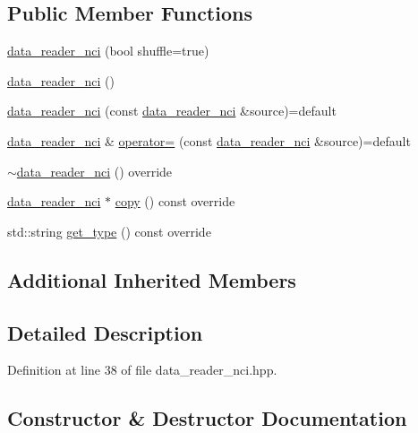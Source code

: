 \subsection*{Public Member Functions}
\begin{DoxyCompactItemize}
\item 
\hyperlink{classlbann_1_1data__reader__nci_aec1e091b879a3a2dee1329dd3e245bd3}{data\+\_\+reader\+\_\+nci} (bool shuffle=true)
\item 
\hyperlink{classlbann_1_1data__reader__nci_a42a40564a0110df69b99832e520111e6}{data\+\_\+reader\+\_\+nci} ()
\item 
\hyperlink{classlbann_1_1data__reader__nci_a3d2f93ffb61faabbdc7006030c518311}{data\+\_\+reader\+\_\+nci} (const \hyperlink{classlbann_1_1data__reader__nci}{data\+\_\+reader\+\_\+nci} \&source)=default
\item 
\hyperlink{classlbann_1_1data__reader__nci}{data\+\_\+reader\+\_\+nci} \& \hyperlink{classlbann_1_1data__reader__nci_aad2847ee20ec7f8d7d25c2ebfff1361e}{operator=} (const \hyperlink{classlbann_1_1data__reader__nci}{data\+\_\+reader\+\_\+nci} \&source)=default
\item 
\hyperlink{classlbann_1_1data__reader__nci_a5aa8e7f832ca763450027fe9886a267f}{$\sim$data\+\_\+reader\+\_\+nci} () override
\item 
\hyperlink{classlbann_1_1data__reader__nci}{data\+\_\+reader\+\_\+nci} $\ast$ \hyperlink{classlbann_1_1data__reader__nci_a642f96edf3efae0d5d0aad70d8a17dbe}{copy} () const override
\item 
std\+::string \hyperlink{classlbann_1_1data__reader__nci_a6709a3d1df162335fa4a6955ea7dcaa2}{get\+\_\+type} () const override
\end{DoxyCompactItemize}
\subsection*{Additional Inherited Members}


\subsection{Detailed Description}


Definition at line 38 of file data\+\_\+reader\+\_\+nci.\+hpp.



\subsection{Constructor \& Destructor Documentation}
\mbox{\label{classlbann_1_1data__reader__nci_aec1e091b879a3a2dee1329dd3e245bd3}} 
